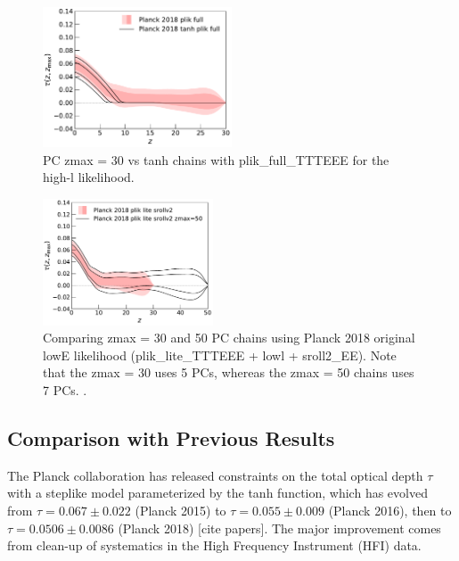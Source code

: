 \documentclass[prd,twocolumn,amsmath,amssymb,floatfix,superscriptaddress,nofootinbib]{revtex4-1}
\begin{document}
\begin{figure}[ht]
\includegraphics[width=0.5\textwidth]{results/direct_mcmc/pl18_plots_zmax30/plot_pub_tau_gtz_dz_0p1_pl18_pc_zmax30_plikfull_and_pl18_tanh_post_plikfull.pdf}
\caption{PC zmax = 30 vs tanh chains with plik\_full\_TTTEEE for the high-l likelihood.
}
\label{fig:plot_taugtz_PC_vs_tanh}
\end{figure}

\begin{figure}[ht]
\includegraphics[width=0.45\textwidth]{results/direct_mcmc/pl18_plots_zmax30/plot_pub_tau_gtz_dz_0p1_pl18_pc_zmax30_pliklite_srollv2_0930_and_pl18_pc_zmax50_pliklite_srollv2.pdf}
\caption{Comparing zmax = 30 and 50 PC chains using Planck 2018 original lowE likelihood (plik\_lite\_TTTEEE + lowl + sroll2\_EE). Note that the zmax = 30 uses 5 PCs, whereas the zmax = 50 chains uses 7 PCs. .
}
\label{fig:plot_taugtz_zmax30_vs_zmax50}
\end{figure}


\subsection{Comparison with Previous Results}

The Planck collaboration has released constraints on the total optical depth $\tau$ with a steplike model parameterized by the tanh function, which has evolved from $\tau = 0.067 \pm 0.022$ (Planck 2015) to $\tau = 0.055 \pm 0.009$ (Planck 2016), then to $\tau = 0.0506 \pm 0.0086$ (Planck 2018) [cite papers]. The major improvement comes from clean-up of systematics in the High Frequency Instrument (HFI) data. 
\end{document}

